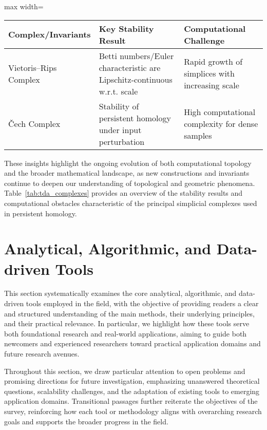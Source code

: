 \documentclass[sigconf]{acmart}
\begin{document}
\begin{table*}[htbp]
\centering
\caption{Summary of Key Properties and Computational Challenges of Vietoris--Rips and Čech Complexes}
\label{tab:tda_complexes}
\begin{adjustbox}{max width=\textwidth}
\begin{tabular}{lll}
\toprule
\textbf{Complex/Invariants} & \textbf{Key Stability Result} & \textbf{Computational Challenge} \\
\midrule
Vietoris--Rips Complex      & Betti numbers/Euler characteristic are Lipschitz-continuous w.r.t. scale & Rapid growth of simplices with increasing scale \\
Čech Complex                & Stability of persistent homology under input perturbation & High computational complexity for dense samples \\
\bottomrule
\end{tabular}
\end{adjustbox}
\end{table*}

These insights highlight the ongoing evolution of both computational topology and the broader mathematical landscape, as new constructions and invariants continue to deepen our understanding of topological and geometric phenomena. Table~\ref{tab:tda_complexes} provides an overview of the stability results and computational obstacles characteristic of the principal simplicial complexes used in persistent homology.

\section{Analytical, Algorithmic, and Data-driven Tools}

This section systematically examines the core analytical, algorithmic, and data-driven tools employed in the field, with the objective of providing readers a clear and structured understanding of the main methods, their underlying principles, and their practical relevance. In particular, we highlight how these tools serve both foundational research and real-world applications, aiming to guide both newcomers and experienced researchers toward practical application domains and future research avenues. 

Throughout this section, we draw particular attention to open problems and promising directions for future investigation, emphasizing unanswered theoretical questions, scalability challenges, and the adaptation of existing tools to emerging application domains. Transitional passages further reiterate the objectives of the survey, reinforcing how each tool or methodology aligns with overarching research goals and supports the broader progress in the field. 
\end{document}
